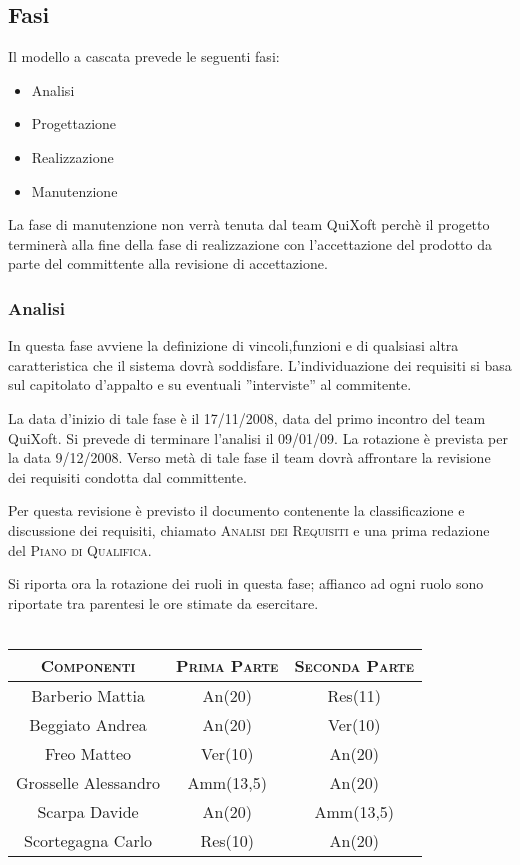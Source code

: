 \documentclass[11pt,a4paper]{article}
\begin{document}
\subsection{Fasi}
Il modello a cascata prevede le seguenti fasi:
\begin{itemize}
\item Analisi
\item Progettazione
\item Realizzazione
\item Manutenzione
\end{itemize}
La fase di manutenzione non verrà tenuta dal team QuiXoft perchè il progetto terminerà alla fine della fase di realizzazione con l'accettazione del prodotto da parte del committente alla revisione di accettazione.
\subsubsection{Analisi}
In questa fase avviene la definizione di vincoli,funzioni e di qualsiasi altra caratteristica che il sistema dovrà soddisfare.
L'individuazione dei requisiti si basa sul capitolato d'appalto e su eventuali ''interviste'' al commitente.

La data d'inizio di tale fase è il 17/11/2008, data del primo incontro del team QuiXoft. Si prevede di terminare l'analisi il 09/01/09.
La rotazione è prevista per la data 9/12/2008. 
Verso metà di tale fase il team dovrà affrontare la revisione dei requisiti condotta dal committente. 

Per questa revisione è previsto il documento contenente la classificazione e discussione dei requisiti, chiamato \textsc{Analisi dei Requisiti} e una prima redazione del \textsc{Piano di Qualifica}. 

Si riporta ora la rotazione dei ruoli in questa fase; affianco ad ogni ruolo sono riportate tra parentesi le ore stimate da esercitare.
\\\\
\begin{tabular}{|c|c|c|}
\hline
\textsc{Componenti} & \textsc{Prima Parte} & \textsc{Seconda Parte} \\ \hline \hline
Barberio Mattia & An(20) & Res(11) \\ \hline
Beggiato Andrea & An(20) & Ver(10) \\ \hline
Freo Matteo & Ver(10) & An(20) \\ \hline
Grosselle Alessandro & Amm(13,5) & An(20) \\ \hline
Scarpa Davide & An(20) & Amm(13,5) \\ \hline
Scortegagna Carlo & Res(10) & An(20) \\ \hline
\end{tabular}
\end{document}
